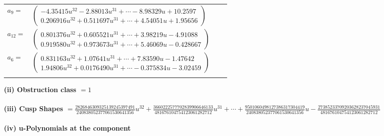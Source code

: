 \documentclass[1p]{elsarticle_modified}
\theoremstyle{definition}
\begin{document}
\begin{tabular}{m{7pt} m{180pt} m{7pt} m{180pt} }
\flushright $a_{9}=$&$\begin{pmatrix}-4.35415 u^{32}-2.88013 u^{31}+\cdots-8.98329 u+10.2597\\0.206916 u^{32}+0.511697 u^{31}+\cdots+4.54051 u+1.95656\end{pmatrix}$ \\
\flushright $a_{12}=$&$\begin{pmatrix}0.801376 u^{32}+0.605521 u^{31}+\cdots+3.98219 u-4.91088\\0.919580 u^{32}+0.973673 u^{31}+\cdots+5.46069 u-0.428667\end{pmatrix}$ \\
\flushright $a_{6}=$&$\begin{pmatrix}0.831163 u^{32}+1.07641 u^{31}+\cdots+7.83590 u-1.47642\\1.94806 u^{32}+0.0176490 u^{31}+\cdots-0.375834 u-3.02459\end{pmatrix}$\\&\end{tabular}
\flushleft \textbf{(ii) Obstruction class $= 1$}\\~\\
\flushleft \textbf{(iii) Cusp Shapes $= \frac{2826846309325139245397491}{240838052377061530641356} u^{32}+\frac{3660222577702839906646133}{481676104754123061282712} u^{31}+\cdots+\frac{9501060498127386317304419}{240838052377061530641356} u-\frac{27385233709203628237045931}{481676104754123061282712}$}\\~\\
\newpage\renewcommand{\arraystretch}{1}
\flushleft \textbf{(iv) u-Polynomials at the component}\newline \\
\end{document}
